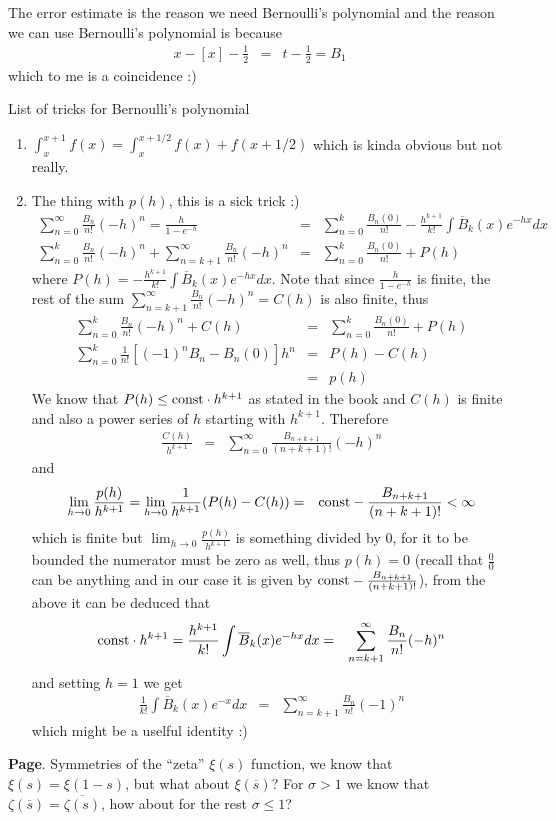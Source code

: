 \documentclass[aps,preprint,preprintnumbers,nofootinbib,showpacs,prd]{revtex4-1}
\newcommand{\nbea}{\begin{eqnarray*}}
\newcommand{\neea}{\end{eqnarray*}}
\begin{document}
The error estimate is the reason we need Bernoulli's polynomial and the reason we can use Bernoulli's polynomial is because
%
\nbea
x -[x] - \frac{1}{2} & = & t - \frac{1}{2} = B_1
\neea
%
which to me is a coincidence :)

List of tricks for Bernoulli's polynomial
%
\begin{enumerate}
%
\item $\int_x^{x + 1} f(x) = \int_x^{x+1/2} f(x) + f(x + 1/2)$ which is kinda obvious but not really.
%
\item The thing with $p(h)$, this is a sick trick :)
%
\nbea
\sum_{n=0}^\infty \frac{B_n}{n!}(-h)^n = \frac{h}{1 - e^{-h}} & = & \sum_{n = 0}^k \frac{B_n(0)}{n!} - \frac{h^{k+1}}{k!} \int\overline{B}_k(x) e^{-hx} dx \\
\sum_{n=0}^k \frac{B_n}{n!}(-h)^n + \sum_{n=k+1}^\infty \frac{B_n}{n!}(-h)^n & = & \sum_{n = 0}^k \frac{B_n(0)}{n!} + P(h) 
\neea
%
where $P(h) = - \frac{h^{k+1}}{k!} \int\overline{B}_k(x) e^{-hx} dx$. Note that since $\frac{h}{1 - e^{-h}}$ is finite, the rest of the sum $\sum_{n=k+1}^\infty \frac{B_n}{n!}(-h)^n = C(h)$ is also finite, thus
%
\nbea
\sum_{n=0}^k \frac{B_n}{n!}(-h)^n + C(h) & = & \sum_{n = 0}^k \frac{B_n(0)}{n!} + P(h)  \\
\sum_{n=0}^k \frac{1}{n!}[(-1)^nB_n - B_n(0)]h^n & = & P(h) - C(h) \\
& = & p(h)
\neea
%
We know that $P(h) \le {\rm const} \cdot h^{k+1}$ as stated in the book and $C(h)$ is finite and also a power series of $h$ starting with $h^{k+1}$. Therefore
%
\nbea
\frac{C(h)}{h^{k+1}} & = & \sum_{n = 0}^\infty \frac{B_{n+k+1}}{(n+k+1)!} (-h)^n
\neea
%
and
%
\nbea
\lim_{h\to 0} \frac{p(h)}{h^{k+1}} = \lim_{h\to 0} \frac{1}{h^{k+1}} (P(h) - C(h)) & = & {\rm const} - \frac{B_{n+k+1}}{(n+k+1)!} < \infty
\neea
%
which is finite but $\lim_{h\to0} \frac{p(h)}{h^{k+1}}$ is something divided by 0, for it to be bounded the numerator must be zero as well, thus $p(h) = 0$ (recall that $\frac{0}{0}$ can be anything and in our case it is given by ${\rm const} - \frac{B_{n+k+1}}{(n+k+1)!}$), from the above it can be deduced that
%
\nbea
{\rm const} \cdot h^{k+1} = \frac{h^{k+1}}{k!} \int\overline{B}_k(x) e^{-hx} dx & = & \sum_{n = k+1}^\infty \frac{B_{n}}{n!} (-h)^n
\neea
%
and setting $h = 1$ we get
%
\nbea
\frac{1}{k!} \int\overline{B}_k(x) e^{-x} dx & = & \sum_{n = k+1}^\infty \frac{B_{n}}{n!} (-1)^n
\neea
%
which might be a uselful identity :)
\end{enumerate}
%


{\bf Page}. Symmetries of the ``zeta'' $\xi(s)$ function, we know that $\xi(s) = \xi(1-s)$, but what about $\xi(\overline{s})$? For $\sigma > 1$ we know that $\zeta(\overline{s}) = \overline{\zeta(s)}$, how about for the rest $\sigma \le 1$?
\end{document}
